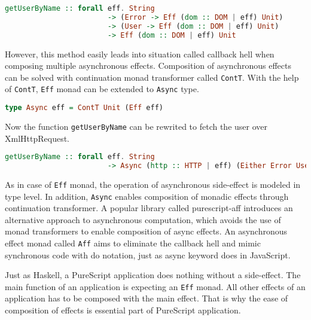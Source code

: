 \documentclass[article]{aaltoseries}
\begin{document}
      \begin{lstlisting}[language=Haskell]
        getUserByName :: forall eff. String 
                        -> (Error -> Eff (dom :: DOM | eff) Unit) 
                        -> (User -> Eff (dom :: DOM | eff) Unit)
                        -> Eff (dom :: DOM | eff) Unit
      \end{lstlisting}
 
      However, this method easily leads into situation called callback hell when
      composing multiple asynchronous effects. Composition of asynchronous
      effects can be solved with continuation monad transformer called
      \lstinline|ContT|. With the help of \lstinline|ContT|, \lstinline|Eff|
      monad can be extended to \lstinline|Async| type.
 
      \begin{lstlisting}[language=Haskell]
        type Async eff = ContT Unit (Eff eff)
      \end{lstlisting}

      Now the function \lstinline|getUserByName| can be rewrited to fetch the
      user over XmlHttpRequest.

      \begin{lstlisting}[language=Haskell]
        getUserByName :: forall eff. String 
                        -> Async (http :: HTTP | eff) (Either Error User)
      \end{lstlisting}
 
      As in case of \lstinline|Eff| monad, the operation of asynchronous
      side-effect is modeled in type level. In addition, \lstinline|Async|
      enables composition of monadic effects through continuation transformer. A
      popular library called purescript-aff introduces an alternative approach
      to asynchronous computation, which avoids the use of monad transformers to
      enable composition of async effects. An asynchronous effect monad called
      \lstinline|Aff| aims to eliminate the callback hell and mimic synchronous
      code with do notation, just as async keyword does in JavaScript.
 
      Just as Haskell, a PureScript application does nothing without a
      side-effect. The main function of an application is expecting an
      \lstinline|Eff| monad. All other effects of an application has to be
      composed with the main effect. That is why the ease of composition of
      effects is essential part of PureScript application.

\end{document}
